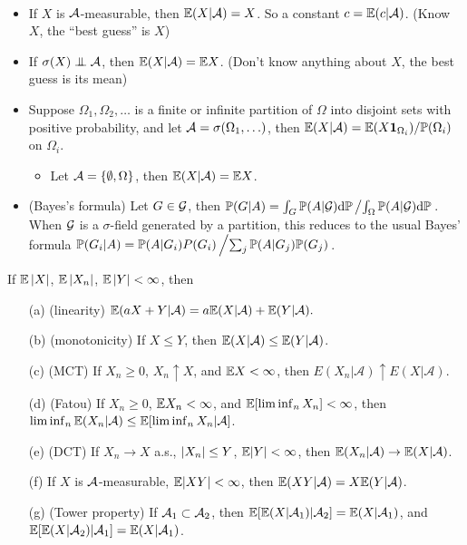 \documentclass[10pt,a4paper]{article}
\begin{document}
\begin{exbox}
	\begin{example}\label{eg:cond_exp}\rm
		\
		\begin{itemize}
			\item If $X$ is ${\cal A}$-measurable, then $\mathbb E(X|{\cal A})=X$. So a constant $c=\mathbb E(c|{\cal A})$. (Know $X$, the ``best guess'' is $X$)
			\item  If $\sigma(X)\indep \calA$, then $\mathbb E(X|{\cal A})=\mathbb E X$. (Don't know anything about $X$, the best guess is its mean) 
			\item Suppose $\Omega_1,\Omega_2,\ldots$ is a finite or infinite partition of $\Omega$ into disjoint sets with positive probability, and let ${\cal A}=\sigma(\Omega_1,\ldots)$, then $\mathbb E(X|{\cal A})=\mathbb E(X{\boldsymbol 1}_{\Omega_i})/\mathbb P(\Omega_i)$ on $\Omega_i$. 
			\begin{itemize}
				\item Let ${\cal A}=\{\emptyset, \Omega\}$, then $\mathbb E(X|{\cal A})=\mathbb E X$.  
			\end{itemize}   
			\item (Bayes's formula)	Let $G\in{\cal G}$, then $\mathbb P (G|A)=\int_G \mathbb P(A|{\cal G}) \mathrm{d} \mathbb P \left/ \int_\Omega \mathbb P(A|{\cal G}) \mathrm{d} \mathbb P \right.$. When ${\cal G}$ is a $\sigma$-field generated by a partition, this reduces to the usual Bayes' formula $\mathbb P(G_i|A)=\mathbb P(A|G_i)P(G_i)\left/ \sum_j \mathbb P(A|G_j)\mathbb P(G_j)\right.$.
		\end{itemize}
	\end{example}
\end{exbox}

\begin{thmbox}
	\begin{theorem}[Properties]\label{thm:cond_exp_prop}\rm
		If $\mathbb E \left\lvert X\right\rvert$, $\mathbb E\left\lvert X_n\right\rvert$, $\mathbb E \left\lvert Y\right\rvert<\infty $, then 
		\begin{itemize}
			\item[(a)] (linearity) $\mathbb E(aX+Y|{\cal A})=a\mathbb E(X|{\cal A})+\mathbb E(Y|{\cal A}).$ 
			\item[(b)] (monotonicity) If $X\leq Y$, then $\mathbb E(X|{\cal A})\leq \mathbb E(Y|{\cal A})$.
			\item[(c)] (MCT) If $X_n\geq 0$, $X_{n}\uparrow X$, and $\mathbb E X<\infty $, then $E(X_n|\mathcal{A})\uparrow E(X|\mathcal{A})$.
			\item[(d)] (Fatou) If $X_n\geq 0$, $\mathbb E X_n<\infty $, and $\mathbb E[ \liminf_n X_n]<\infty $, then $\liminf_n\mathbb E(X_n|{\cal A})\leq \mathbb E[\liminf_n X_n|{\cal A}]$.   
			\item[(e)] (DCT) If $X_n\to X$ a.s., $\left\lvert X_n\right\rvert\leq Y$, $\mathbb E|Y|<\infty $, then $\mathbb E(X_n|{\cal A})\to\mathbb E(X|{\cal A})$. 
			\item[(f)] If $X$ is ${\cal A}$-measurable, $\mathbb E|XY|<\infty $, then $\mathbb E(XY|{\cal A})=X\mathbb E(Y|{\cal A})$.     
			\item[(g)] (Tower property) If ${\cal A}_1\subset{\cal A}_2$, then $\mathbb E[\mathbb E(X|{\cal A}_1)|{\cal A}_2]=\mathbb E(X|{\cal A}_1)$, and $\mathbb E[\mathbb E(X|{\cal A}_2)|{\cal A}_1]=\mathbb E(X|{\cal A}_1)$.
		\end{itemize}  
	\end{theorem}
\end{thmbox}
\end{document}
